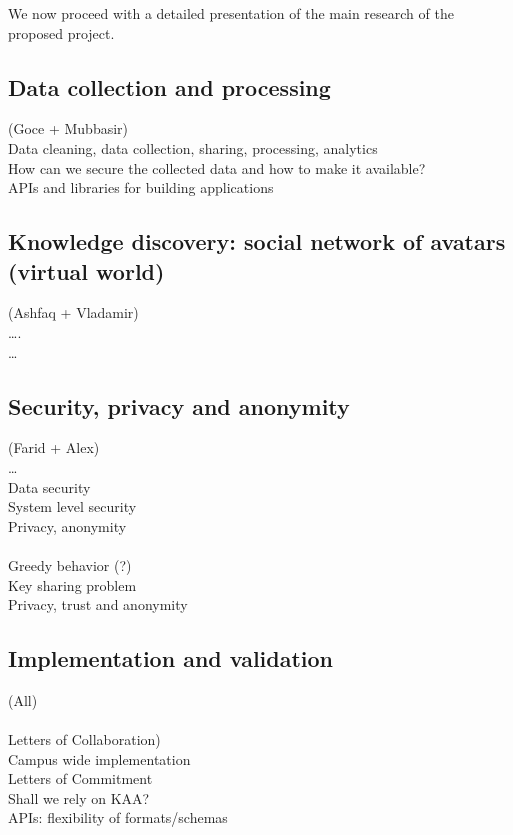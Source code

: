 We now proceed with a detailed presentation of the main research of the proposed project. 


\subsection{Data collection and processing} 
(Goce + Mubbasir)\\
Data cleaning, data collection, sharing, processing, analytics\\
How can we secure the collected data and how to make it available?\\
APIs and libraries for building applications 


 

\subsection{Knowledge discovery: social network of avatars (virtual world)}
(Ashfaq + Vladamir)\\
….\\
…\\

\subsection{Security, privacy and anonymity}
(Farid + Alex)\\
…\\
Data security\\
System level security\\
Privacy, anonymity\\
\\
Greedy behavior (?)\\
Key sharing problem\\ 
Privacy, trust and anonymity \\

\subsection{Implementation and validation }
(All)\\
\\
Letters of Collaboration)\\
Campus wide implementation \\
Letters of Commitment\\
Shall we rely on KAA?\\
APIs: flexibility of formats/schemas\\

 
